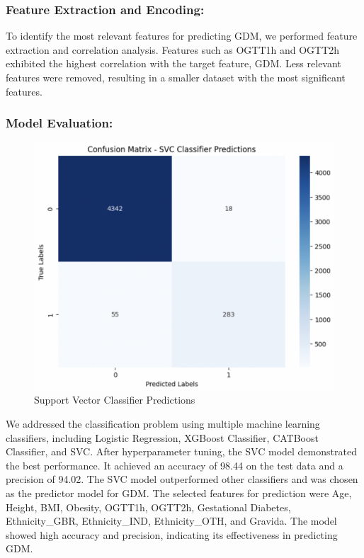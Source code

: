 \documentclass[conference,compsoc]{IEEEtran}
\begin{document}
\subsubsection{Feature Extraction and Encoding:}
To identify the most relevant features for predicting GDM, we performed feature extraction and correlation analysis. Features such as OGTT1h and OGTT2h exhibited the highest correlation with the target feature, GDM. Less relevant features were removed, resulting in a smaller dataset with the most significant features.

\subsubsection{Model Evaluation:}

\begin{figure}[!htbp]
  \centering
  \includegraphics[width=0.8\columnwidth]{Confusion_matrix.png} %
  \caption{Support Vector Classifier Predictions}
  \label{fig:glucometer_diag}
\end{figure}

We addressed the classification problem using multiple machine learning classifiers, including Logistic Regression, XGBoost Classifier, CATBoost Classifier, and SVC. After hyperparameter tuning, the SVC model demonstrated the best performance. It achieved an accuracy of 98.44 on the test data and a precision of 94.02. The SVC model outperformed other classifiers and was chosen as the predictor model for GDM. The selected features for prediction were Age, Height, BMI, Obesity, OGTT1h, OGTT2h, Gestational Diabetes, Ethnicity\_GBR, Ethnicity\_IND, Ethnicity\_OTH, and Gravida. The model showed high accuracy and precision, indicating its effectiveness in predicting GDM.
\end{document}

